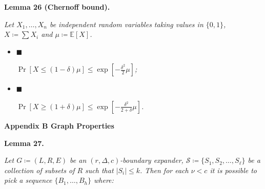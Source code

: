 \documentclass[10pt,a4paper]{article}
\begin{document}
\par\medskip\noindent\textbf{
\textbf{Lemma 26}\textbf{ }(Chernoff bound)\textbf{.}
}\par



\emph{Let $X_{1},\dots,X_{n}$ be independent random variables taking values in $\{0,1\}$, $X\coloneqq\sum X_{i}$ and $\mu\coloneqq\mathbb{E}[X]$.}\par


\begin{itemize}


\item[] 
$\blacksquare$ 


$\Pr[X\leq(1-\delta)\mu]\leq\exp\left[-\frac{\delta^{2}}{2}\mu\right]$\emph{;}\par





\item[] 
$\blacksquare$ 


$\Pr[X\geq(1+\delta)\mu]\leq\exp\left[-\frac{\delta^{2}}{2+\delta}\mu\right]$\emph{.}\par





\end{itemize}







\par\medskip\noindent\textbf{
Appendix B Graph Properties}\par





\par\medskip\noindent\textbf{
\textbf{Lemma 27}\textbf{.}
}\par



\emph{Let $G\coloneqq(L,R,E)$ be an $(r,\Delta,c)$-boundary expander, $\mathcal{S}\coloneqq\{S_{1},S_{2},\dots,S_{\ell}\}$ be a collection of subsets of $R$ such that $|S_{i}|\leq k$. Then for each $\nu<c$ it is possible to pick a sequence $\{B_{1},\dots,B_{h}\}$ where:}\par
\end{document}
